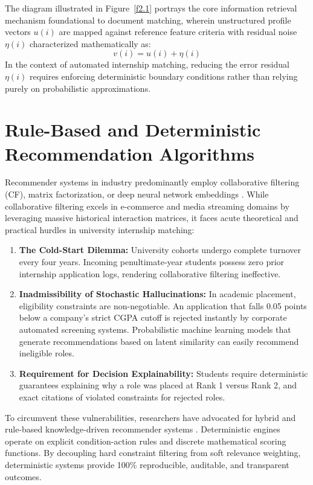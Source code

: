 The diagram illustrated in Figure~\ref{f2.1} portrays the core information retrieval mechanism foundational to document matching, wherein unstructured profile vectors $u(i)$ are mapped against reference feature criteria with residual noise $\eta(i)$ characterized mathematically as:
\begin{equation}
	v(i) = u(i) + \eta(i) \label{e2.1}
\end{equation}
In the context of automated internship matching, reducing the error residual $\eta(i)$ requires enforcing deterministic boundary conditions rather than relying purely on probabilistic approximations.

\section{Rule-Based and Deterministic Recommendation Algorithms} \label{S2.2}
Recommender systems in industry predominantly employ collaborative filtering (CF), matrix factorization, or deep neural network embeddings \cite{ref4}. While collaborative filtering excels in e-commerce and media streaming domains by leveraging massive historical interaction matrices, it faces acute theoretical and practical hurdles in university internship matching:
\begin{enumerate}[label=\textbf{\roman*)}]
	\item \textbf{The Cold-Start Dilemma:} University cohorts undergo complete turnover every four years. Incoming penultimate-year students possess zero prior internship application logs, rendering collaborative filtering ineffective.
	\item \textbf{Inadmissibility of Stochastic Hallucinations:} In academic placement, eligibility constraints are non-negotiable. An application that falls 0.05 points below a company's strict CGPA cutoff is rejected instantly by corporate automated screening systems. Probabilistic machine learning models that generate recommendations based on latent similarity can easily recommend ineligible roles.
	\item \textbf{Requirement for Decision Explainability:} Students require deterministic guarantees explaining why a role was placed at Rank 1 versus Rank 2, and exact citations of violated constraints for rejected roles.
\end{enumerate}

To circumvent these vulnerabilities, researchers have advocated for hybrid and rule-based knowledge-driven recommender systems \cite{ref5}. Deterministic engines operate on explicit condition-action rules and discrete mathematical scoring functions. By decoupling hard constraint filtering from soft relevance weighting, deterministic systems provide 100\% reproducible, auditable, and transparent outcomes.

